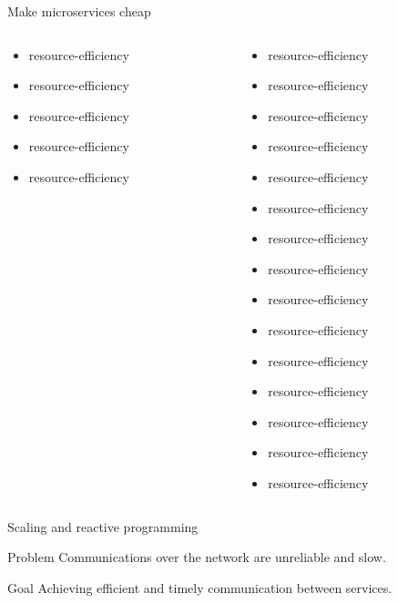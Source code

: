 \documentclass{beamer}
\begin{document}
\begin{frame}{Make microservices cheap}
\begin{columns}
\begin{column}{0.36\textwidth}
\begin{itemize}
                \item resource-efficiency
                \item resource-efficiency
                \item resource-efficiency
                \item resource-efficiency
                \item resource-efficiency
            \end{itemize}
        \end{column}
        \begin{column}{0.36\textwidth}
            \begin{itemize}
                \item resource-efficiency
                \item resource-efficiency
                \item resource-efficiency
                \item resource-efficiency
                \item resource-efficiency
                \item resource-efficiency
                \item resource-efficiency
                \item resource-efficiency
                \item resource-efficiency
                \item resource-efficiency
                \item resource-efficiency
                \item resource-efficiency
                \item resource-efficiency
                \item resource-efficiency
                \item resource-efficiency
            \end{itemize}
        \end{column}
    \end{columns}
\end{frame}
\begin{frame}{Scaling and reactive programming}
    \begin{alertblock}{Problem}
        Communications over the network are unreliable and slow.
    \end{alertblock}
    \begin{block}{Goal}
        Achieving efficient and timely communication between services.
    \end{block}
\end{frame}
\end{document}
